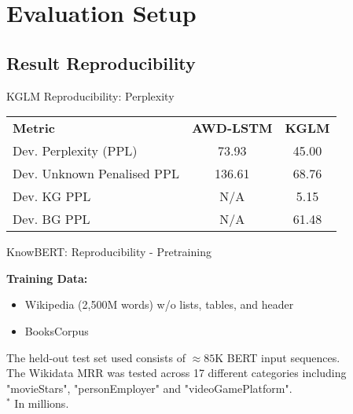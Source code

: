 \section{Evaluation Setup}

\subsection{Result Reproducibility}

\begin{frame}{KGLM Reproducibility: Perplexity}
\begin{table}[]
    \centering
    \tiny
    \begin{tabular}{l|c|c}
   \textbf{Metric} & \textbf{AWD-LSTM} \cite{Merity2017RegularizingModels} & \textbf{KGLM} \cite{Logan2019BaracksModeling} \\
   Dev. Perplexity (PPL)  & 73.93 & 45.00  \\
   Dev. Unknown Penalised PPL & 136.61 & 68.76 \\
   Dev. KG PPL & N/A & 5.15 \\
   Dev. BG PPL & N/A & 61.48 \\
    \end{tabular}
\end{table}

    \begin{figure}
        \centering
        \resizebox{0.5\textwidth}{!}{
        
        }
    \end{figure}

\end{frame}

\begin{frame}{KnowBERT: Reproducibility - Pretraining}
    {\footnotesize
    \textbf{Training Data:}
    \begin{itemize}
        \item Wikipedia (2,500M words) w/o lists, tables, and header
        \item BooksCorpus 
    \end{itemize}
    }
    
    {\footnotesize
    {\dggr}The held-out test set used consists of $\approx 85$K BERT input sequences. \\
    {\textdaggerdbl} The Wikidata MRR was tested across 17 different categories including "movieStars", "personEmployer" and "videoGamePlatform".\\
    {$^\ast$} In millions. \\
    }
\end{frame}

